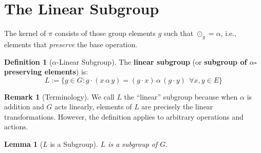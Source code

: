 \documentclass[11pt,a4paper,openany]{book}
\theoremstyle{plain}
\newtheorem{lemma}[theorem]{Lemma}
\theoremstyle{definition}
\newtheorem{definition}[theorem]{Definition}
\newtheorem{remark}[theorem]{Remark}
\newcommand{\twing}[1]{\odot_{#1}}
\newcommand{\lingroup}{L}
\newcommand{\actspace}{E}
\newcommand{\groupG}{G}
\begin{document}
\section{The Linear Subgroup}

The kernel of $\pi$ consists of those group elements $g$ such that $\twing{g} = \alpha$, i.e., elements that \emph{preserve} the base operation.

\begin{definition}[$\alpha$-Linear Subgroup]\label{def:linear-subgroup}
The \textbf{linear subgroup} (or \textbf{subgroup of $\alpha$-preserving elements}) is:
\[
\lingroup := \{g \in \groupG : g \cdot (x \,\alpha\, y) = (g \cdot x) \,\alpha\, (g \cdot y)\;\, \forall x,y \in \actspace\}
\]
\end{definition}

\begin{remark}[Terminology]
We call $\lingroup$ the ``linear'' subgroup because when $\alpha$ is addition and $\groupG$ acts linearly, elements of $\lingroup$ are precisely the linear transformations. However, the definition applies to arbitrary operations and actions.
\end{remark}

\begin{lemma}[$\lingroup$ is a Subgroup]\label{lem:L-subgroup}
$\lingroup$ is a subgroup of $\groupG$.
\end{lemma}
\end{document}
